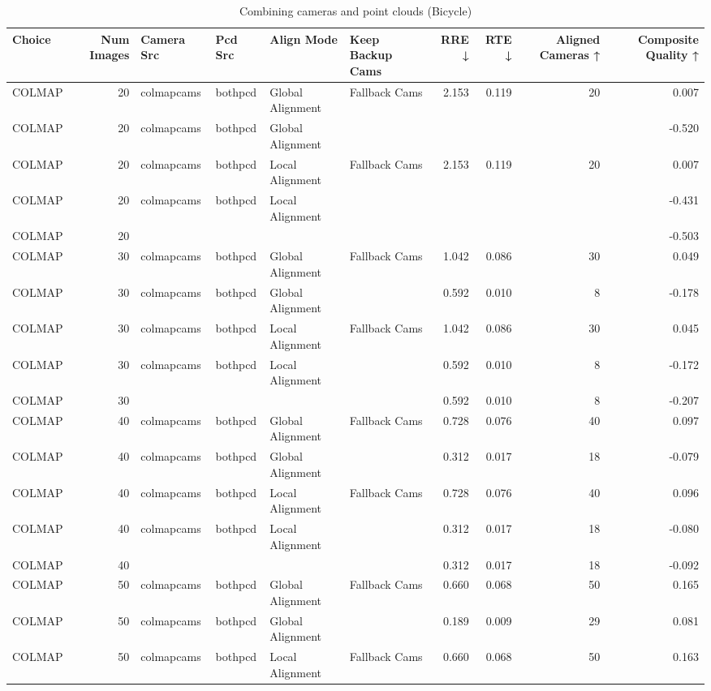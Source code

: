 \begin{table}[H]
\caption{Combining cameras and point clouds (Bicycle)}
\label{tab:07_combined_full_bicycle}
\begin{tabular}{lrllllrrrr}
\toprule
Choice & Num Images & Camera Src & Pcd Src & Align Mode & Keep Backup Cams & RRE ↓ & RTE ↓ & Aligned Cameras ↑ & Composite Quality ↑ \\
\midrule
COLMAP & 20 & colmapcams & bothpcd & Global Alignment & Fallback Cams & 2.153 & 0.119 & 20 & 0.007 \\
COLMAP & 20 & colmapcams & bothpcd & Global Alignment &  &  &  &  & -0.520 \\
COLMAP & 20 & colmapcams & bothpcd & Local Alignment & Fallback Cams & 2.153 & 0.119 & 20 & 0.007 \\
COLMAP & 20 & colmapcams & bothpcd & Local Alignment &  &  &  &  & -0.431 \\
COLMAP & 20 &  &  &  &  &  &  &  & -0.503 \\
COLMAP & 30 & colmapcams & bothpcd & Global Alignment & Fallback Cams & 1.042 & 0.086 & 30 & 0.049 \\
COLMAP & 30 & colmapcams & bothpcd & Global Alignment &  & 0.592 & 0.010 & 8 & -0.178 \\
COLMAP & 30 & colmapcams & bothpcd & Local Alignment & Fallback Cams & 1.042 & 0.086 & 30 & 0.045 \\
COLMAP & 30 & colmapcams & bothpcd & Local Alignment &  & 0.592 & 0.010 & 8 & -0.172 \\
COLMAP & 30 &  &  &  &  & 0.592 & 0.010 & 8 & -0.207 \\
COLMAP & 40 & colmapcams & bothpcd & Global Alignment & Fallback Cams & 0.728 & 0.076 & 40 & 0.097 \\
COLMAP & 40 & colmapcams & bothpcd & Global Alignment &  & 0.312 & 0.017 & 18 & -0.079 \\
COLMAP & 40 & colmapcams & bothpcd & Local Alignment & Fallback Cams & 0.728 & 0.076 & 40 & 0.096 \\
COLMAP & 40 & colmapcams & bothpcd & Local Alignment &  & 0.312 & 0.017 & 18 & -0.080 \\
COLMAP & 40 &  &  &  &  & 0.312 & 0.017 & 18 & -0.092 \\
COLMAP & 50 & colmapcams & bothpcd & Global Alignment & Fallback Cams & 0.660 & 0.068 & 50 & 0.165 \\
COLMAP & 50 & colmapcams & bothpcd & Global Alignment &  & 0.189 & 0.009 & 29 & 0.081 \\
COLMAP & 50 & colmapcams & bothpcd & Local Alignment & Fallback Cams & 0.660 & 0.068 & 50 & 0.163 \\

\end{tabular}
\end{table}
